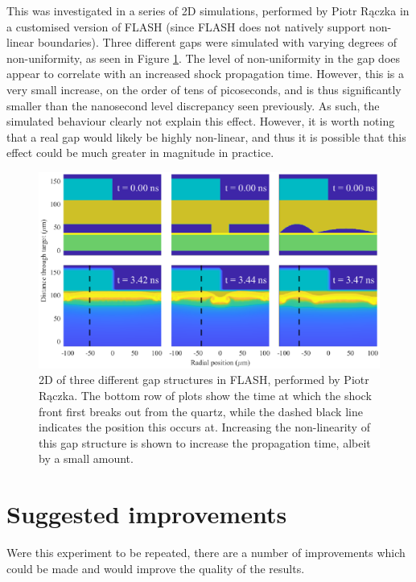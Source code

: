 This was investigated in a series of 2D simulations, performed by Piotr R\k{a}czka in a customised version of FLASH (since FLASH does not natively support non-linear boundaries). Three different gaps were simulated with varying degrees of non-uniformity, as seen in Figure \ref{fig:GapSims}. The level of non-uniformity in the gap does appear to correlate with an increased shock propagation time. However, this is a very small increase, on the order of tens of picoseconds, and is thus significantly smaller than the nanosecond level discrepancy seen previously. As such, the simulated behaviour clearly not explain this effect. However, it is worth noting that a real gap would likely be highly non-linear, and thus it is possible that this effect could be much greater in magnitude in practice.

\begin{figure} [h!]
\begin{centering}
\includegraphics[width=1\textwidth]{figures/Experiment/GapSims.eps}%
\caption{\label{fig:GapSims} 2D of three different gap structures in FLASH, performed by Piotr R\k{a}czka. The bottom row of plots show the time at which the shock front first breaks out from the quartz, while the dashed black line indicates the position this occurs at. Increasing the non-linearity of this gap structure is shown to increase the propagation time, albeit by a small amount.}
\end{centering}
\end{figure}

\section{Suggested improvements} \label{Suggested Improvements}

Were this experiment to be repeated, there are a number of improvements which could be made and would improve the quality of the results.

